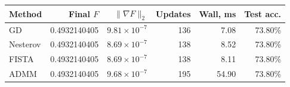 \begin{center}
\small\setlength{\tabcolsep}{5pt}\renewcommand{\arraystretch}{1.3}
\begin{tabular}{lrrrrr}
\toprule
Method & Final $F$ & $\|\nabla F\|_2$ & Updates & Wall, ms & Test acc. \\
\midrule
GD & 0.4932140405 & $9.81\times10^{-7}$ & 136 & 7.08 & 73.80\% \\
Nesterov & 0.4932140405 & $8.69\times10^{-7}$ & 138 & 8.52 & 73.80\% \\
FISTA & 0.4932140405 & $8.69\times10^{-7}$ & 138 & 8.11 & 73.80\% \\
ADMM & 0.4932140405 & $9.68\times10^{-7}$ & 195 & 54.90 & 73.80\% \\
\bottomrule
\end{tabular}
\end{center}
